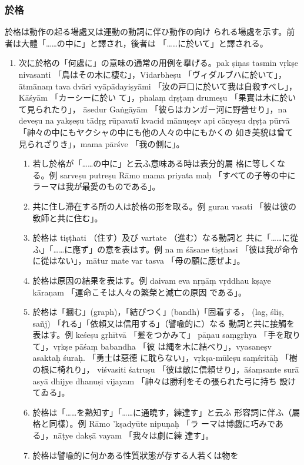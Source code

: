 \subsubsection{於格}
\numberParagraph
於格は動作の起る場處又は運動の動詞に伴ひ動作の向け
られる場處を示す。前者は大體「……の中に」と譯され，後者は
「……に於いて」と譯される。
\begin{enumerate}[label=(\arabic*)]
\item 次に於格の「何處に」の意味の通常の用例を擧げる。pak\-%
ṣiṇas tasmin vṛkṣe nivasanti 「鳥はその木に棲む」，Vidarbheṣu
「ヴィダルブハに於いて」，ātmānaṃ tava dvāri vyāpādayiṣyāmi
「汝の戸口に於いて我は自殺すべし」，Kāśyām 「カーシーに於い
て」，phalaṃ dṛṣṭaṃ drumeṣu 「果實は木に於いて見られたり」，
āsedur Gaṅgāyām 「彼らはカンガー河に野營せり」，na deveṣu na
yakṣeṣu tādṛg rūpavatī kvacid mānuṣeṣv api cānyeṣu dṛṣṭa\-%
pūrvā 「神々の中にもヤクシャの中にも他の人々の中にもかくの
如き美貌は曾て見られざりき」，mama pārśve 「我の側に」。
\begin{enumerate}[label=(\alph*)]
\item 若し於格が「……の中に」と云ふ意味ある時は表分的屬
格に等しくなる。例 sarveṣu putreṣu Rāmo mama priyata\-%
maḥ 「すべての子等の中にラーマは我が最愛のものである」。
\item 共に住し滯在する所の人は於格の形を取る。例 gurau
vasati 「彼は彼の敎師と共に住む」。
\item 於格は tiṣṭhati （住す）及び vartate （進む）なる動詞と
共に「……に從ふ」「……に應ず」の意を表はす。例 na m
śāsane tiṣṭhasi 「彼は我が命令に從はない」，mātur mate var\-%
tasva 「母の願に應ぜよ」。
\item 於格は原因の結果を表はす。例 daivam eva nṛṇāṃ
vṛddhau kṣaye kāraṇam 「運命こそは人々の繁榮と滅亡の原因
である」。
\item 於格は「摑む」(graph)，「結びつく」(bandh)「固着する，
(lag, śliṣ, sañj) 「れる」「依賴又は信用する」（譬喩的に）なる
動詞と共に接觸を表はす。例 keśeṣu gṛhītvā 「髪をつかみて」
pāṇau saṃgṛhya 「手を取りて」，vṛkṣe pāśaṃ babandha 「彼
は縄を木に結べり」，vyasaneṣv asaktaḥ śuraḥ. 「勇士は惡德
に耽らない」，vṛkṣa-mūleṣu saṃśritāḥ 「樹の根に椅れり」，
viśvasiti śatruṣu 「彼は敵に信賴せり」，āśaṃsante surā asyā\-%
dhijye dhanuṣi vijayam 「神々は勝利をその張られた弓に持ち
設けてゐる」。
\item 於格は「……を熟知す」「……に通曉す，練達す」と云ふ
形容詞に伴ふ（屬格と同樣）。例 Rāmo 'kṣadyūte nipuṇaḥ 「ラ
ーマは博戯に巧みである」，nāṭye dakṣā vayam 「我々は劇に練
達す」。
\item 於格は譬喩的に何かある性質狀態が存する人若くは物を

\end{enumerate}
\end{enumerate}
